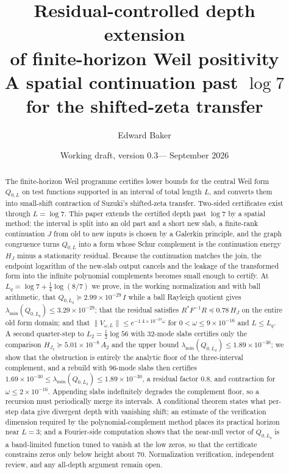 \documentclass[11pt]{article}
\title{Residual-controlled depth extension\protect\\ of finite-horizon Weil positivity\protect\\[5pt]
\large A spatial continuation past $\log 7$ for the shifted-zeta transfer}
\author{Edward Baker}
\date{Working draft, version 0.3\quad---\quad 10 September 2026}
\numberwithin{equation}{section}
\theoremstyle{definition}
\theoremstyle{remark}
\newcommand{\norm}[1]{\lVert#1\rVert}
\newcommand{\Lq}{L_q}
\newcommand{\Ltwo}{L_2}
\newcommand{\FloorAbs}{2.99\times10^{-29}}          %
\newcommand{\ShiftBound}{9\times10^{-16}}           %
\newcommand{\ContractRate}{1.4\times10^{-29}}       %
\newcommand{\ThetaBest}{0.78}                       %
\newcommand{\MuTwo}{5.01\times10^{-8}}                         %
\newcommand{\UpperLq}{3.29\times10^{-29}}                     %
\newcommand{\UpperLtwo}{1.89\times10^{-30}}                 %
\newcommand{\FloorTwo}{1.69\times10^{-30}}          %
\newcommand{\ThetaTwo}{0.8}                         %
\newcommand{\ShiftTwo}{2\times10^{-16}}             %
\begin{document}
\maketitle
\begin{abstract}
The finite-horizon Weil programme certifies lower bounds for the central Weil form $Q_{0,L}$ on test functions supported in an interval of total length $L$, and converts them into small-shift contraction of Suzuki's shifted-zeta transfer. Two-sided certificates exist through $L=\log7$. This paper extends the certified depth past $\log7$ by a spatial method: the interval is split into an old part and a short new slab, a finite-rank continuation $J$ from old to new inputs is chosen by a Galerkin principle, and the graph congruence turns $Q_{0,L}$ into a form whose Schur complement is the continuation energy $H_J$ minus a stationarity residual. Because the continuation matches the join, the endpoint logarithm of the new-slab output cancels and the leakage of the transformed form into the infinite polynomial complements becomes small enough to certify. At $\Lq=\log7+\tfrac14\log(8/7)$ we prove, in the working normalization and with ball arithmetic, that $Q_{0,\Lq}\succeq\FloorAbs\,I$ while a ball Rayleigh quotient gives $\lambda_{\min}(Q_{0,\Lq})\le\UpperLq$; that the residual satisfies $R^*F^{-1}R\preceq\ThetaBest\,H_J$ on the entire old form domain; and that $\norm{V_{\omega,L}}\le e^{-\ContractRate\omega}$ for $0<\omega\le\ShiftBound$ and $L\le\Lq$. A second quarter-step to $\Ltwo=\tfrac12\log56$ with 32-mode slabs certifies only the comparison $H_{J_2}\succeq\MuTwo\,A_2$ and the upper bound $\lambda_{\min}(Q_{0,\Ltwo})\le\UpperLtwo$; we show that the obstruction is entirely the analytic floor of the three-interval complement, and a rebuild with 96-mode slabs then certifies $\FloorTwo\le\lambda_{\min}(Q_{0,\Ltwo})\le\UpperLtwo$, a residual factor $\ThetaTwo$, and contraction for $\omega\le\ShiftTwo$. Appending slabs indefinitely degrades the complement floor, so a recursion must periodically merge its intervals. A conditional theorem states what per-step data give divergent depth with vanishing shift; an estimate of the verification dimension required by the polynomial-complement method places its practical horizon near $L=3$; and a Fourier-side computation shows that the near-null vector of $Q_{0,\Lq}$ is a band-limited function tuned to vanish at the low zeros, so that the certificate constrains zeros only below height about $70$. Normalization verification, independent review, and any all-depth argument remain open.
\end{abstract}
\end{document}
